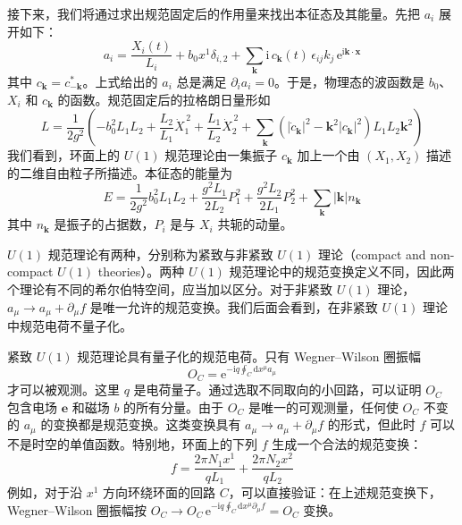 接下来，我们将通过求出规范固定后的作用量来找出本征态及其能量。先把 $a_i$ 展开如下：
\begin{equation*}
a_i = \frac{X_i(t)}{L_i} + b_0 x^1 \delta_{i,2} + \sum_{\pmb{k}} \mathrm{i}\, c_{\pmb{k}}(t)\, \epsilon_{ij} k_j\, \mathrm{e}^{\mathrm{i}\pmb{k}\cdot\pmb{x}}\tag{6.3.4}
\end{equation*}
其中 $c_{\pmb{k}} = c^*_{-\pmb{k}}$。上式给出的 $a_i$ 总是满足 $\partial_i a_i = 0$。于是，物理态的波函数是 $b_0$、$X_i$ 和 $c_{\pmb{k}}$ 的函数。规范固定后的拉格朗日量形如
\begin{equation*}
L = \frac{1}{2g^2}\left(-b_0^2 L_1 L_2 + \frac{L_2}{L_1}\dot{X}_1^{\,2} + \frac{L_1}{L_2}\dot{X}_2^{\,2} + \sum_{\pmb{k}} \left(|\dot{c}_{\pmb{k}}|^2 - \pmb{k}^2 |c_{\pmb{k}}|^2\right) L_1 L_2 \pmb{k}^2\right)
\end{equation*}
我们看到，环面上的 $U(1)$ 规范理论由一集振子 $c_{\pmb{k}}$ 加上一个由 $(X_1, X_2)$ 描述的二维自由粒子所描述。本征态的能量为
\begin{equation*}
E = \frac{1}{2g^2} b_0^2 L_1 L_2 + \frac{g^2 L_1}{2L_2} P_1^2 + \frac{g^2 L_2}{2L_1} P_2^2 + \sum_{\pmb{k}} |\pmb{k}| n_{\pmb{k}}
\end{equation*}
其中 $n_{\pmb{k}}$ 是振子的占据数，$P_i$ 是与 $X_i$ 共轭的动量。

$U(1)$ 规范理论有两种，分别称为紧致与非紧致 $U(1)$ 理论（compact and non-compact $U(1)$ theories）。两种 $U(1)$ 规范理论中的规范变换定义不同，因此两个理论有不同的希尔伯特空间，应当加以区分。对于非紧致 $U(1)$ 理论，$a_\mu \to a_\mu + \partial_\mu f$ 是唯一允许的规范变换。我们后面会看到，在非紧致 $U(1)$ 理论中规范电荷不量子化。

紧致 $U(1)$ 规范理论具有量子化的规范电荷。只有 Wegner--Wilson 圈振幅
\begin{equation*}
O_C = \mathrm{e}^{-\mathrm{i} q \oint_C \mathrm{d}x^\mu a_\mu}
\end{equation*}
才可以被观测。这里 $q$ 是电荷量子。通过选取不同取向的小回路，可以证明 $O_C$ 包含电场 $\pmb{e}$ 和磁场 $b$ 的所有分量。由于 $O_C$ 是唯一的可观测量，任何使 $O_C$ 不变的 $a_\mu$ 的变换都是规范变换。这类变换具有 $a_\mu \to a_\mu + \partial_\mu f$ 的形式，但此时 $f$ 可以不是时空的单值函数。特别地，环面上的下列 $f$ 生成一个合法的规范变换：
\begin{equation*}
f = \frac{2\pi N_1 x^1}{q L_1} + \frac{2\pi N_2 x^2}{q L_2}\tag{6.3.5}
\end{equation*}
例如，对于沿 $x^1$ 方向环绕环面的回路 $C$，可以直接验证：在上述规范变换下，Wegner--Wilson 圈振幅按 $O_C \to O_C\, \mathrm{e}^{-\mathrm{i} q \oint_C \mathrm{d}x^\mu \partial_\mu f} = O_C$ 变换。

